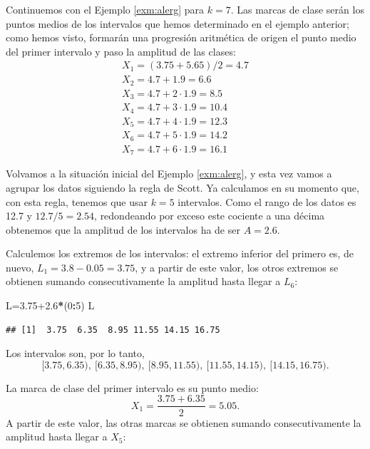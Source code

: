 \documentclass[]{book}
\newenvironment{Shaded}{\begin{snugshade}}{\end{snugshade}}
\newcommand{\DecValTok}[1]{\textcolor[rgb]{0.00,0.00,0.81}{#1}}
\newcommand{\FloatTok}[1]{\textcolor[rgb]{0.00,0.00,0.81}{#1}}
\newcommand{\NormalTok}[1]{#1}
\newcommand{\OperatorTok}[1]{\textcolor[rgb]{0.81,0.36,0.00}{\textbf{#1}}}
\theoremstyle{definition}
\theoremstyle{definition}
\theoremstyle{definition}
\theoremstyle{remark}
\let\BeginKnitrBlock\begin \let\EndKnitrBlock\end
\begin{document}
\BeginKnitrBlock{example}
\protect\hypertarget{exm:unnamed-chunk-622}{}{\label{exm:unnamed-chunk-622} }Continuemos con el Ejemplo \ref{exm:alerg} para \(k=7\). Las marcas de clase serán los puntos medios de los intervalos que hemos determinado en el ejemplo anterior; como hemos visto, formarán una progresión aritmética de origen el punto medio del primer intervalo y paso la amplitud de las clases:
\[
\begin{array}{l}
X_1=(3.75+5.65)/2=4.7\\
X_2= 4.7 +1.9= 6.6\\
X_3= 4.7 + 2\cdot 1.9 = 8.5\\
X_4= 4.7 + 3\cdot 1.9= 10.4\\
X_5= 4.7 + 4\cdot 1.9= 12.3\\
X_6=4.7 + 5\cdot 1.9= 14.2\\
X_7= 4.7 + 6\cdot 1.9= 16.1
\end{array}
\]
\EndKnitrBlock{example}

\BeginKnitrBlock{example}
\protect\hypertarget{exm:alerg7cl}{}{\label{exm:alerg7cl} }Volvamos a la situación inicial del Ejemplo \ref{exm:alerg}, y esta vez vamos a agrupar los datos siguiendo la regla de Scott.
Ya calculamos en su momento que, con esta regla, tenemos que usar \(k=5\) intervalos. Como el rango de los datos es 12.7 y \(12.7/5=2.54\), redondeando por exceso este cociente a una décima obtenemos que la amplitud de los intervalos ha de ser \(A=2.6\).
\EndKnitrBlock{example}

Calculemos los extremos de los intervalos: el extremo inferior del primero es, de nuevo, \(L_1=3.8-0.05=3.75\), y a partir de este valor, los otros extremos se obtienen sumando consecutivamente la amplitud hasta llegar a \(L_6\):

\begin{Shaded}
\begin{Highlighting}[]
\NormalTok{L=}\FloatTok{3.75+2.6}\OperatorTok{*}\NormalTok{(}\DecValTok{0}\OperatorTok{:}\DecValTok{5}\NormalTok{)}
\NormalTok{L}
\end{Highlighting}
\end{Shaded}

\begin{verbatim}
## [1]  3.75  6.35  8.95 11.55 14.15 16.75
\end{verbatim}

Los intervalos son, por lo tanto,
\[
[3.75, 6.35),\ [6.35,8.95),\ [8.95,11.55),\ [11.55, 14.15),\ [14.15 ,16.75).
\]

La marca de clase del primer intervalo es su punto medio:
\[
X_1=\frac{3.75+ 6.35}{2}= 5.05.
\]
A partir de este valor, las otras marcas se obtienen sumando consecutivamente la amplitud hasta llegar a \(X_5\):
\end{document}
